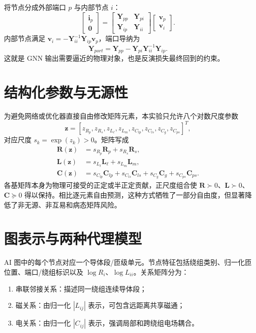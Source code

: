 \documentclass[10pt,a4paper]{ctexart}
\begin{document}
将节点分成外部端口 $p$ 与内部节点 $i$：
\begin{equation}
\begin{bmatrix}\bm i_p\\\bm 0\end{bmatrix}=
\begin{bmatrix}\bm Y_{pp}&\bm Y_{pi}\\\bm Y_{ip}&\bm Y_{ii}\end{bmatrix}
\begin{bmatrix}\bm v_p\\\bm v_i\end{bmatrix}.
\end{equation}
内部节点满足 $\bm v_i=-\bm Y_{ii}^{-1}\bm Y_{ip}\bm v_p$，端口导纳为
\begin{equation}
 \boxed{\bm Y_{port}=\bm Y_{pp}-\bm Y_{pi}\bm Y_{ii}^{-1}\bm Y_{ip}.}
\end{equation}
这就是 GNN 输出需要逼近的物理对象，也是反演损失最终回到的约束。

\section{结构化参数与无源性}
为避免网络或优化器直接自由修改矩阵元素，本实验只允许八个对数尺度参数
\begin{equation}
\bm z=[z_{R_p},z_{R_s},z_{L_\ell},z_{L_m},z_{C_{lp}},z_{C_{ls}},z_{C_g},z_{C_{ps}}]^T,
\end{equation}
对应尺度 $s_k=\exp(z_k)>0$。矩阵写成
\begin{align}
 \bm R(\bm z)&=s_{R_p}\bm R_p+s_{R_s}\bm R_s,\\
 \bm L(\bm z)&=s_{L_\ell}\bm L_\ell+s_{L_m}\bm L_m,\\
 \bm C(\bm z)&=s_{C_{lp}}\bm C_{lp}+s_{C_{ls}}\bm C_{ls}+s_{C_g}\bm C_g+s_{C_{ps}}\bm C_{ps}.
\end{align}
各基矩阵本身为物理可接受的正定或半正定贡献，正尺度组合使 $\bm R\succ0$、$\bm L\succ0$、$\bm C\succeq0$ 得以保持。相比逐元素自由预测，这种方式牺牲了一部分自由度，但显著降低了非无源、非互易和病态矩阵风险。

\section{图表示与两种代理模型}
AI 图中的每个节点对应一个导体段/匝级单元。节点特征包括绕组类别、归一化匝位置、端口/绕组标识以及 $\log R_i$、$\log L_{ii}$。关系矩阵分为：
\begin{enumerate}
 \item 串联邻接关系：描述同一绕组连续导体段；
 \item 磁关系：由归一化 $|L_{ij}|$ 表示，可包含远距离共享磁通；
 \item 电关系：由归一化 $|C_{ij}|$ 表示，强调局部和跨绕组电场耦合。
\end{enumerate}
\end{document}
